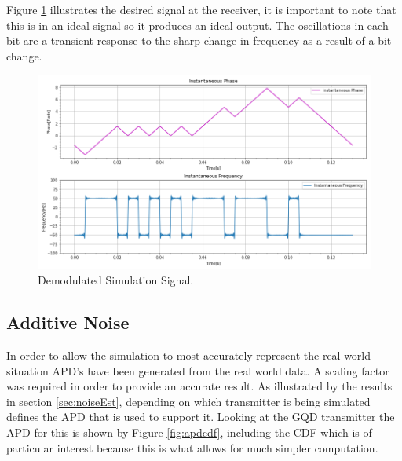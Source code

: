 Figure \ref{fig:simDemod} illustrates the desired signal at the receiver, it is important to note that this is in an ideal signal so it produces an ideal output. The oscillations in each bit are a transient response to the sharp change in frequency as a result of a bit change. 

\begin{figure}[h!]
    \centering
    \includegraphics[width = \textwidth]{figs/sim/simDemod.png}
    \caption{Demodulated Simulation Signal.}
    \label{fig:simDemod}
\end{figure}

\newpage
\subsection{Additive Noise}
In order to allow the simulation to most accurately represent the real world situation APD's have been generated from the real world data. A scaling factor was required in order to provide an accurate result. As illustrated by the results in section \ref{sec:noiseEst}, depending on which transmitter is being simulated defines the APD that is used to support it. Looking at the GQD transmitter the APD for this is shown by Figure \ref{fig:apdcdf}, including the CDF which is of particular interest because this is what allows for much simpler computation.

